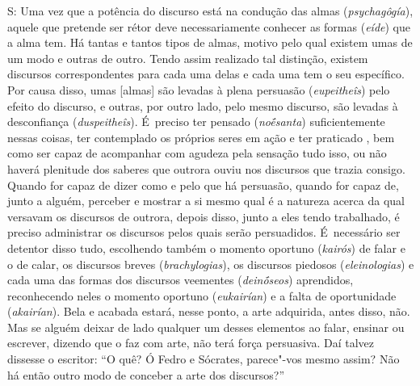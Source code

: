 S: Uma vez que a potência do discurso está na condução das almas
(\emph{psychagôgía}), \bekker{[271d]} aquele que pretende ser rétor
deve necessariamente conhecer as formas (\emph{eíde}) que a alma tem. Há
tantas e tantos tipos de almas, motivo pelo qual existem umas de um modo
e outras de outro. Tendo assim realizado tal distinção, existem
discursos correspondentes para cada uma delas e cada uma tem o seu
específico. Por causa disso, umas [almas] são levadas à plena
persuasão (\emph{eupeitheîs}) pelo efeito do discurso, e outras, por
outro lado, pelo mesmo discurso, são levadas à desconfiança
(\emph{duspeitheîs}). É~preciso ter pensado (\emph{noḗsanta})
suficientemente nessas coisas, ter contemplado os próprios seres em ação
e ter praticado \bekker{[271e]}, bem como ser capaz de acompanhar com agudeza
pela sensação tudo isso, ou não haverá plenitude dos saberes que outrora
ouviu nos discursos que trazia consigo. Quando for capaz de dizer como e
pelo que há persuasão, quando for capaz de, junto a alguém, perceber e
mostrar a si mesmo qual é a natureza \bekker{[272a]} acerca da qual versavam
os discursos de outrora, depois disso, junto a eles tendo trabalhado, é
preciso administrar os discursos pelos quais serão persuadidos. É~necessário ser detentor disso tudo, escolhendo também o momento oportuno
(\emph{kairós}) de falar e o de calar, os discursos breves
(\emph{brachylogias}), os discursos piedosos
(\emph{eleinologias}) e cada uma das formas dos discursos veementes
(\emph{deinṓseos}) aprendidos, reconhecendo neles o momento
oportuno (\emph{eukairían}) e a falta de oportunidade (\emph{akairían}).
Bela e acabada estará, nesse ponto, a arte adquirida, antes disso, não.
\bekker{[272b]} Mas se alguém deixar de lado qualquer um desses elementos ao
falar, ensinar ou escrever, dizendo que o faz com arte, não terá força
persuasiva. Daí talvez dissesse o escritor: ``O quê? Ó Fedro e Sócrates,
parece"-vos mesmo assim? Não há então outro modo de conceber a arte dos
discursos?''

